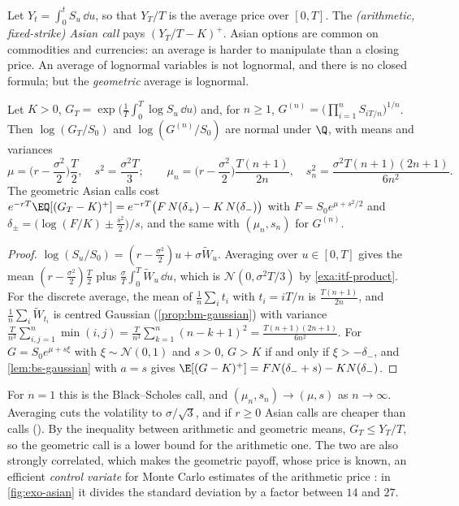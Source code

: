 Let $Y_t=\int_0^tS_u\,\dd u$, so that $Y_T/T$ is the average price over $[0,T]$. The
\emph{(arithmetic, fixed-strike) Asian call} pays $(Y_T/T-K)^+$. Asian options are common on
commodities and currencies: an average is harder to manipulate than a closing price. An average of
lognormal variables is not lognormal, and there is no closed formula; but the \emph{geometric}
average is lognormal.

\begin{proposition}\label{prop:exo-asian-geometric}
Let $K>0$, $G_T=\exp\big(\frac1T\int_0^T\log S_u\,\dd u\big)$ and, for $n\ge1$,
$G^{(n)}=\big(\prod_{i=1}^nS_{iT/n}\big)^{1/n}$. Then $\log(G_T/S_0)$ and $\log(G^{(n)}/S_0)$ are
normal under $\Q$, with means and variances
\[
  \mu=\Big(r-\frac{\sigma^2}2\Big)\frac T2,\quad s^2=\frac{\sigma^2T}3;\qquad
  \mu_n=\Big(r-\frac{\sigma^2}2\Big)\frac{T(n+1)}{2n},\quad s_n^2=\frac{\sigma^2T(n+1)(2n+1)}{6n^2}.
\]
The geometric Asian calls cost
$e^{-rT}\EQ[(G_T-K)^+]=e^{-rT}\big(F\,N(\delta_+)-K\,N(\delta_-)\big)$ with $F=S_0e^{\mu+s^2/2}$ and
$\delta_\pm=\big(\log(F/K)\pm\frac{s^2}2\big)/s$, and the same with $(\mu_n,s_n)$ for $G^{(n)}$.
\end{proposition}

\begin{proof}
$\log(S_u/S_0)=(r-\frac{\sigma^2}2)u+\sigma\widetilde W_u$. Averaging over $u\in[0,T]$ gives the mean
$(r-\frac{\sigma^2}2)\frac T2$ plus $\frac\sigma T\int_0^T\widetilde W_u\,\dd u$, which is
$\mathcal N(0,\sigma^2T/3)$ by \cref{exa:itf-product}. For the discrete average, the mean of
$\frac1n\sum_it_i$ with $t_i=iT/n$ is $\frac{T(n+1)}{2n}$, and $\frac1n\sum_i\widetilde W_{t_i}$ is
centred Gaussian (\cref{prop:bm-gaussian}) with variance
$\frac{T}{n^3}\sum_{i,j=1}^n\min(i,j)=\frac T{n^3}\sum_{k=1}^n(n-k+1)^2=\frac{T(n+1)(2n+1)}{6n^2}$.
For $G=S_0e^{\mu+s\xi}$ with $\xi\sim\mathcal N(0,1)$ and $s>0$, $G>K$ if and only if $\xi>-\delta_-$,
and \cref{lem:bs-gaussian} with $a=s$ gives $\E[(G-K)^+]=FN(\delta_-+s)-KN(\delta_-)$.
\end{proof}

For $n=1$ this is the Black--Scholes call, and $(\mu_n,s_n)\to(\mu,s)$ as $n\to\infty$. Averaging
cuts the volatility to $\sigma/\sqrt3$, and if $r\ge0$ Asian calls are cheaper than calls
(). By the inequality between arithmetic and geometric means, $G_T\le Y_T/T$, so the geometric call is a
lower bound for the arithmetic one. The two are also strongly correlated, which makes the
geometric payoff, whose price is known, an efficient \emph{control variate} for Monte Carlo
estimates of the arithmetic price \citep{kemna-vorst-1990}: in \cref{fig:exo-asian} it divides the
standard deviation by a factor between $14$ and $27$.

